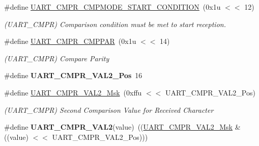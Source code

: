 \begin{DoxyCompactItemize}
\#define \mbox{\hyperlink{group__SAME70__UART_ga150f46983b40fcaa87d327062197971b}{U\+A\+R\+T\+\_\+\+C\+M\+P\+R\+\_\+\+C\+M\+P\+M\+O\+D\+E\+\_\+\+S\+T\+A\+R\+T\+\_\+\+C\+O\+N\+D\+I\+T\+I\+ON}}~(0x1u $<$$<$ 12)
\begin{DoxyCompactList}\small\item\em (U\+A\+R\+T\+\_\+\+C\+M\+PR) Comparison condition must be met to start reception. \end{DoxyCompactList}\item 
\mbox{\label{group__SAME70__UART_ga50794fcacde1aa94e918b04a8d9cf908}} 
\#define \mbox{\hyperlink{group__SAME70__UART_ga50794fcacde1aa94e918b04a8d9cf908}{U\+A\+R\+T\+\_\+\+C\+M\+P\+R\+\_\+\+C\+M\+P\+P\+AR}}~(0x1u $<$$<$ 14)
\begin{DoxyCompactList}\small\item\em (U\+A\+R\+T\+\_\+\+C\+M\+PR) Compare Parity \end{DoxyCompactList}\item 
\mbox{\label{group__SAME70__UART_ga4568462f5495dc5df8e7d02898ae36c5}} 
\#define {\bfseries U\+A\+R\+T\+\_\+\+C\+M\+P\+R\+\_\+\+V\+A\+L2\+\_\+\+Pos}~16
\item 
\mbox{\label{group__SAME70__UART_gae17736fd7c755e474908a189301ef43e}} 
\#define \mbox{\hyperlink{group__SAME70__UART_gae17736fd7c755e474908a189301ef43e}{U\+A\+R\+T\+\_\+\+C\+M\+P\+R\+\_\+\+V\+A\+L2\+\_\+\+Msk}}~(0xffu $<$$<$ U\+A\+R\+T\+\_\+\+C\+M\+P\+R\+\_\+\+V\+A\+L2\+\_\+\+Pos)
\begin{DoxyCompactList}\small\item\em (U\+A\+R\+T\+\_\+\+C\+M\+PR) Second Comparison Value for Received Character \end{DoxyCompactList}\item 
\mbox{\label{group__SAME70__UART_ga18039981fbf277f8316cd92256980dfd}} 
\#define {\bfseries U\+A\+R\+T\+\_\+\+C\+M\+P\+R\+\_\+\+V\+A\+L2}(value)~((\mbox{\hyperlink{group__SAMV71__UART_gae17736fd7c755e474908a189301ef43e}{U\+A\+R\+T\+\_\+\+C\+M\+P\+R\+\_\+\+V\+A\+L2\+\_\+\+Msk}} \& ((value) $<$$<$ U\+A\+R\+T\+\_\+\+C\+M\+P\+R\+\_\+\+V\+A\+L2\+\_\+\+Pos)))
\item 
\mbox{\label{group__SAME70__UART_gab930e465c6acf9e610bd01ebb4bf6668}} 

\end{DoxyCompactItemize}
